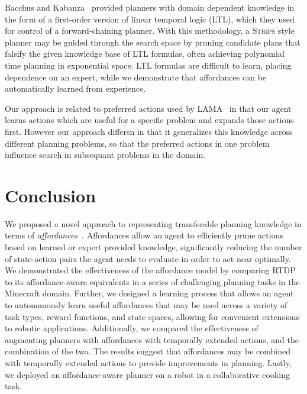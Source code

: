 \documentclass[letterpaper]{article}
\begin{document}
Bacchus and
Kabanza~\cite{Bacchus95usingtemporal,Bacchus99usingtemporal} provided
planners with domain dependent knowledge in the form of a first-order
version of linear temporal logic (LTL), which they used for control of
a forward-chaining planner. With this methodology, a \textsc{Strips}
style planner may be guided through the search space by pruning
candidate plans that falsify the given knowledge base of LTL formulas,
often achieving polynomial time planning in exponential space.  LTL
formulas are difficult to learn, placing dependence on an expert,
while we demonstrate that affordances can be automatically learned
from experience.

Our approach is related to preferred actions used by
LAMA~\citep{richter10} in that our agent learns actions which are
useful for a specific problem and expands those actions first.
However our approach differsn in that it generalizes this knowledge
across different planning problems, so that the preferred actions in
one problem influence search in subsequant problems in the domain.



\section{Conclusion}
\label{sec:conclusion}
We proposed a novel approach to representing transferable planning
knowledge in terms of {\em affordances}~\cite{gibson77}. Affordances
allow an agent to efficiently prune actions based on learned or expert
provided knowledge, significantly reducing the number of state-action
pairs the agent needs to evaluate in order to act near optimally. We
demonstrated the effectiveness of the affordance model by comparing
RTDP to its affordance-aware equivalents in a series of challenging
planning tasks in the Minecraft domain. Further, we designed a
learning process that allows an agent to autonomously learn useful
affordances that may be used across a variety of task types, reward
functions, and state spaces, allowing for convenient extensions to
robotic applications.  Additionally, we compared the effectiveness of
augmenting planners with affordances with temporally extended actions,
and the combination of the two. The results suggest that affordances
may be combined with temporally extended actions to provide
improvements in planning.  Lastly, we deployed an affordance-aware
planner on a robot in a collaborative cooking task.
\end{document}
